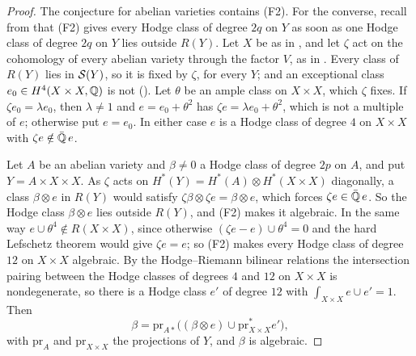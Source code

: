 \begin{proof}
The conjecture for abelian varieties contains (F2). For the converse, recall
from  that (F2) gives every Hodge class of degree $2q$ on
$Y$ as soon as one Hodge class of degree $2q$ on $Y$ lies outside $R(Y)$. Let
$X$ be as in , and let $\zeta$ act on the cohomology of
every abelian variety through the factor $V$, as in .
Every class of $R(Y)$ lies in $\mathcal{S}(Y)$, so it is fixed by $\zeta$, for every
$Y$; and an exceptional class $e_{0}\in H^{4}(X\times X,\mathbb{Q})$ is not
(). Let $\theta$ be an ample class on $X\times X$,
which $\zeta$ fixes. If $\zeta e_{0}=\lambda e_{0}$, then $\lambda\ne1$ and
$e=e_{0}+\theta^{2}$ has $\zeta e=\lambda e_{0}+\theta^{2}$, which is not a
multiple of $e$; otherwise put $e=e_{0}$. In either case $e$ is a Hodge class
of degree $4$ on $X\times X$ with $\zeta e\notin\bar{\mathbb{Q}}\,e$.

Let $A$ be an abelian variety and $\beta\ne0$ a Hodge class of degree $2p$ on
$A$, and put $Y=A\times X\times X$. As $\zeta$ acts on
$H^{*}(Y)=H^{*}(A)\otimes H^{*}(X\times X)$ diagonally, a class
$\beta\otimes e$ in $R(Y)$ would satisfy
$\zeta\beta\otimes\zeta e=\beta\otimes e$, which forces $\zeta e\in\bar{\mathbb{Q}}\,e$.
So the Hodge class $\beta\otimes e$ lies outside $R(Y)$, and (F2) makes it
algebraic. In the same way $e\cup\theta^{4}\notin R(X\times X)$, since
otherwise $(\zeta e-e)\cup\theta^{4}=0$ and the hard Lefschetz theorem would
give $\zeta e=e$; so (F2) makes every Hodge class of degree $12$ on
$X\times X$ algebraic. By the Hodge--Riemann bilinear relations the
intersection pairing between the Hodge classes of degrees $4$ and $12$ on
$X\times X$ is nondegenerate, so there is a Hodge class $e'$ of degree $12$
with $\int_{X\times X}e\cup e'=1$. Then
\[
  \beta=\mathrm{pr}_{A*}\bigl((\beta\otimes e)\cup
  \mathrm{pr}_{X\times X}^{*}e'\bigr),
\]
with $\mathrm{pr}_{A}$ and $\mathrm{pr}_{X\times X}$ the projections of $Y$,
and $\beta$ is algebraic.
\end{proof}

